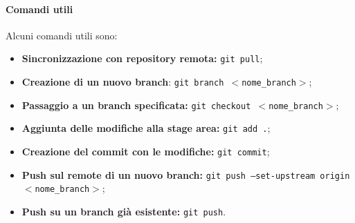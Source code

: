 \documentclass[a4paper, 12pt]{article}
\begin{document}
\paragraph{Comandi utili}
Alcuni comandi utili sono:
\begin{itemize}
\item \textbf{Sincronizzazione con repository remota:} \texttt{git pull};
\item \textbf{Creazione di un nuovo branch}: \texttt{git branch $<$nome\_branch$>$};
\item \textbf{Passaggio a un branch specificata:} \texttt{git checkout $<$nome\_branch$>$};
\item \textbf{Aggiunta delle modifiche alla stage area:} \texttt{git add .};
\item \textbf{Creazione del commit con le modifiche:} \texttt{git commit};
\item \textbf{Push sul remote di un nuovo branch:} \texttt{git push --set-upstream origin $<$nome\_branch$>$};
\item \textbf{Push su un branch già esistente:} \texttt{git push}.
\end{itemize}
\end{document}
